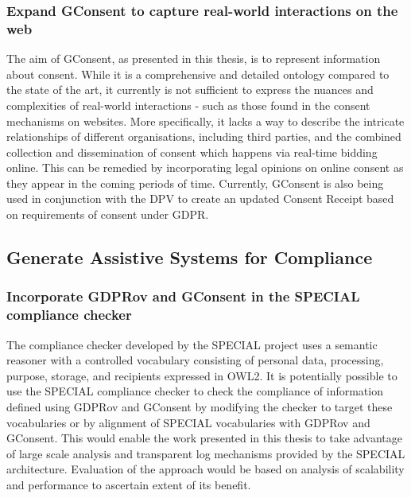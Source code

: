 \subsubsection*{Expand GConsent to capture real-world interactions on the web}
The aim of GConsent, as presented in this thesis, is to represent information about consent. While it is a comprehensive and detailed ontology compared to the state of the art, it currently is not sufficient to express the nuances and complexities of real-world interactions - such as those found in the consent mechanisms on websites. More specifically, it lacks a way to describe the intricate relationships of different organisations, including third parties, and the combined collection and dissemination of consent which happens via real-time bidding online. This can be remedied by incorporating legal opinions on online consent as they appear in the coming periods of time.
Currently, GConsent is also being used in conjunction with the DPV to create an updated Consent Receipt \cite{lizar_consent_2017} based on requirements of consent under GDPR.

\subsection*{Generate Assistive Systems for Compliance}
\subsubsection*{Incorporate GDPRov and GConsent in the SPECIAL compliance checker}
The compliance checker developed by the SPECIAL project \cite{kirrane_scalable_2018} uses a semantic reasoner \cite{bonatti_fast_2018} with a controlled vocabulary consisting of personal data, processing, purpose, storage, and recipients expressed in OWL2. It is potentially possible to use the SPECIAL compliance checker to check the compliance of information defined using GDPRov and GConsent by modifying the checker to target these vocabularies or by alignment of SPECIAL vocabularies with GDPRov and GConsent. This would enable the work presented in this thesis to take advantage of large scale analysis and transparent log mechanisms provided by the SPECIAL architecture. Evaluation of the approach would be based on analysis of scalability and performance to ascertain extent of its benefit.


